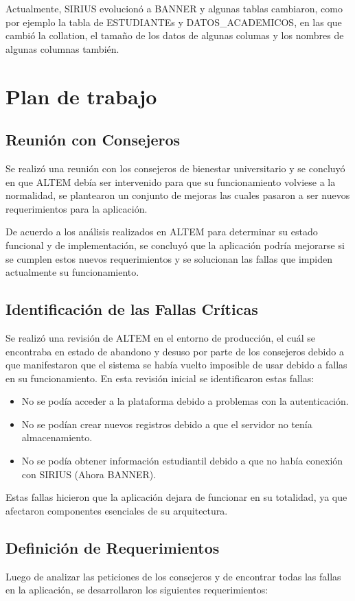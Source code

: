 Actualmente, SIRIUS evolucionó a BANNER y algunas tablas cambiaron, como por ejemplo la tabla de ESTUDIANTEs y DATOS\_ACADEMICOS, en las que cambió la collation, el tamaño de los datos de algunas columas y los nombres de algunas columnas también.

\section{Plan de trabajo}
\subsection{Reunión con Consejeros}
Se realizó una reunión con los consejeros de bienestar universitario y se concluyó en que ALTEM debía ser intervenido para que su funcionamiento volviese a la normalidad, se plantearon un conjunto de mejoras las cuales pasaron a ser nuevos requerimientos para la aplicación.

De acuerdo a los análisis realizados en ALTEM para determinar su estado funcional y de implementación, se concluyó que la aplicación podría mejorarse si se cumplen estos nuevos requerimientos y se solucionan las fallas que impiden actualmente su funcionamiento.

\subsection{Identificación de las Fallas Críticas}
Se realizó una revisión de ALTEM en el entorno de producción, el cuál se encontraba en estado de abandono y desuso por parte de los consejeros debido a que manifestaron que el sistema se había vuelto imposible de usar debido a fallas en su funcionamiento. 
En esta revisión inicial se identificaron estas fallas: 

\begin{itemize}
    \item No se podía acceder a la plataforma debido a problemas con la autenticación.
    \item No se podían crear nuevos registros debido a que el servidor no tenía almacenamiento.
    \item No se podía obtener información estudiantil debido a que no había conexión con SIRIUS (Ahora BANNER).
\end{itemize}

Estas fallas hicieron que la aplicación dejara de funcionar en su totalidad, ya que afectaron componentes esenciales de su arquitectura.

\subsection{Definición de Requerimientos}
Luego de analizar las peticiones de los consejeros y de encontrar todas las fallas en la aplicación, se desarrollaron los siguientes requerimientos:

